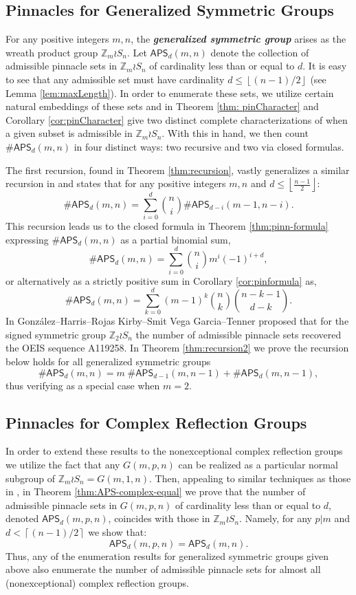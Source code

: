 \documentclass[12pt,reqno]{amsart}
\numberwithin{equation}{section}
\theoremstyle{plain}
\theoremstyle{definition}
\theoremstyle{remark}
\newcommand{\Z}{\mathbb{Z}}
\newcommand\APS{\mathsf{APS}}
\newcommand{\ceil}[1]{\left\lceil#1\right\rceil}
\newcommand{\floor}[1]{\left\lfloor#1\right\rfloor}
\newcommand{\newword}[1]{\emph{\textbf{#1}}}
\begin{document}
\subsection*{Pinnacles for Generalized Symmetric Groups} For any positive integers $m,n$, the \newword{generalized symmetric group} arises as the wreath product group $\Z_m \wr S_n$. Let $\APS_d(m,n)$ denote the collection of admissible pinnacle sets in $\Z_m \wr S_n$ of cardinality less than or equal to $d$. It is easy to see that any admissible set must have cardinality $d \leq \floor{(n-1)/2}$ (see Lemma \ref{lem:maxLength}). In order to enumerate these sets, we utilize certain natural embeddings of these sets and in Theorem \ref{thm: pinCharacter} and Corollary \ref{cor:pinCharacter} give two distinct complete characterizations of when a given subset is admissible in $\Z_m \wr S_n$. With this in hand, we then count $\#\APS_d(m,n)$ in four distinct ways: two recursive and two via closed formulas. 

The first recursion, found in Theorem \ref{thm:recursion}, vastly generalizes a similar recursion in \cite[Proposition 3.11]{PinSignedPermutations} and states that for any positive integers $m,n$ and $d\leq \floor{\frac{n-1}{2}}$:
\[
\#\APS_d(m,n) =\sum_{i=0}^d\binom{n}{i}\#\APS_{d-i}(m-1,n-i).
\]
This recursion leads us to the closed formula in Theorem \ref{thm:pinn-formula} expressing $\#\APS_d(m,n)$ as a partial binomial sum,
\[
\#\APS_d(m,n)= \sum_{i=0}^{d} \binom{n}{i}m^i(-1)^{i+d},
\]
or alternatively as a strictly positive sum in Corollary \ref{cor:pinformula} as,
\[
\#\APS_d(m,n)= \sum_{k=0}^d(m-1)^k \binom{n}{k}\binom{n-k-1}{d-k}.
    \]
 In \cite[Conjecture 5.1]{PinSignedPermutations} Gonz\'alez--Harris--Rojas Kirby--Smit Vega Garcia--Tenner proposed that for the signed symmetric group $\Z_2 \wr S_n$ the number of admissible pinnacle sets recovered the OEIS sequence A119258. In Theorem \ref{thm:recursion2} we prove the recursion below holds for all generalized symmetric groups 
 \[
 \#\APS_d(m,n) = m\;\#\APS_{d-1}(m,n-1)+\#\APS_d(m,n-1),
 \]
 thus verifying \cite[Conjecture 5.1]{PinSignedPermutations} as a special case when $m=2$. 

\subsection*{Pinnacles for Complex Reflection Groups} In order to extend these results to the nonexceptional complex reflection groups we utilize the fact that any $G(m,p,n)$ can be realized as a particular normal subgroup of $\Z_m \wr S_n = G(m,1,n)$. Then, appealing to similar techniques as those in \cite{PinSignedPermutations}, in Theorem \ref{thm:APS-complex-equal} we prove that the number of admissible pinnacle sets in $G(m,p,n)$ of cardinality less than or equal to $d$, denoted $\APS_d(m,p,n)$, coincides with those in $\Z_m \wr S_n $. Namely, for any $p|m$ and $d<\ceil{(n-1)/2}$ we show that:
\[
\APS_d(m,p,n) = \APS_d(m,n).
\]
Thus, any of the enumeration results for generalized symmetric groups given above also enumerate the number of admissible pinnacle sets for almost all (nonexceptional) complex reflection groups. 
\end{document}
